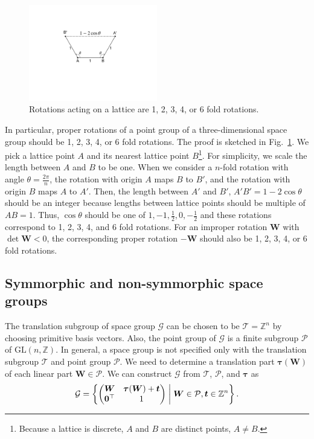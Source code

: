 \begin{figure}[tb]
  \centering
  \includegraphics[width=0.5\textwidth]{figure/fig_crystallographic_rotation_3d.pdf}
  \caption{Rotations acting on a lattice are 1, 2, 3, 4, or 6 fold rotations.}
  \label{fig:crystallographic_rotation_3d}
\end{figure}

In particular, proper rotations of a point group of a three-dimensional space group should be 1, 2, 3, 4, or 6 fold rotations.
The proof is sketched in Fig.~\ref{fig:crystallographic_rotation_3d}.
We pick a lattice point $A$ and its nearest lattice point $B$\footnote{
  Because a lattice is discrete, $A$ and $B$ are distinct points, $A \neq B$.
}.
For simplicity, we scale the length between $A$ and $B$ to be one.
When we consider a $n$-fold rotation with angle $\theta = \frac{2\pi}{n}$, the rotation with origin $A$ maps $B$ to $B'$, and the rotation with origin $B$ maps $A$ to $A'$.
Then, the length between $A'$ and $B'$, $A'B' = 1 - 2 \cos \theta$ should be an integer because lengths between lattice points should be multiple of $AB=1$.
Thus, $\cos \theta$ should be one of $1, -1, \frac{1}{2}, 0, -\frac{1}{2}$ and these rotations correspond to 1, 2, 3, 4, and 6 fold rotations.
For an improper rotation $\bm{W}$ with $\det \bm{W} < 0$, the corresponding proper rotation $-\bm{W}$ should also be 1, 2, 3, 4, or 6 fold rotations.

\subsection{\label{sec:vector_system}Symmorphic and non-symmorphic space groups}

The translation subgroup of space group $\mathcal{G}$ can be chosen to be $\mathcal{T} = \mathbb{Z}^{n}$ by choosing primitive basis vectors.
Also, the point group of $\mathcal{G}$ is a finite subgroup $\mathcal{P}$ of $\mathrm{GL}(n, \mathbb{Z})$.
In general, a space group is not specified only with the translation subgroup $\mathcal{T}$ and point group $\mathcal{P}$.
We need to determine a translation part $\bm{\tau}(\bm{W})$ of each linear part $\bm{W} \in \mathcal{P}$.
We can construct $\mathcal{G}$ from $\mathcal{T}$, $\mathcal{{P}}$, and $\bm{\tau}$ as
\begin{align}
  \mathcal{G} = \left\{ 
    \begin{pmatrix}
      \bm{W} & \bm{\tau}(\bm{W}) + \bm{t} \\
      \bm{0}^{\top} & 1 \\
    \end{pmatrix}
   \mathrel{}\middle|\mathrel{} 
    \bm{W} \in \mathcal{P}, \bm{t} \in \mathbb{Z}^{n}
   \right\}.
\end{align}

